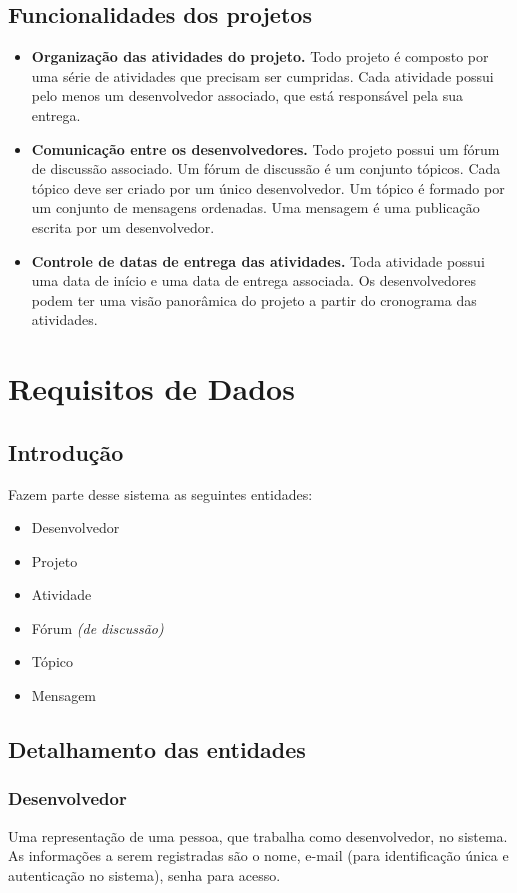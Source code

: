\documentclass{article}
\begin{document}
	\subsection{Funcionalidades dos projetos}
	\begin{itemize}
		\item \textbf{Organização das atividades do projeto.} Todo projeto é composto por uma série de atividades que precisam ser cumpridas. Cada atividade possui pelo menos um desenvolvedor associado, que está responsável pela sua entrega.

		\item \textbf{Comunicação entre os desenvolvedores.} Todo projeto possui um fórum de discussão associado. Um fórum de discussão é um conjunto tópicos. Cada tópico deve ser criado por um único desenvolvedor. Um tópico é formado por um conjunto de mensagens ordenadas. Uma mensagem é uma publicação escrita por um desenvolvedor.

		\item \textbf{Controle de datas de entrega das atividades.} Toda atividade possui uma data de início e uma data de entrega associada. Os desenvolvedores podem ter uma visão panorâmica do projeto a partir do cronograma das atividades.
	\end{itemize}


\section{Requisitos de Dados}

	\subsection{Introdução}
	Fazem parte desse sistema as seguintes entidades:
	\begin{itemize}
		\item Desenvolvedor
		\item Projeto
		\item Atividade
		\item Fórum \textit{(de discussão)}
		\item Tópico
		\item Mensagem
	\end{itemize}

	\subsection{Detalhamento das entidades}

		\subsubsection{Desenvolvedor}
		Uma representação de uma pessoa, que trabalha como desenvolvedor, no sistema. As informações a serem registradas são o nome, e-mail (para identificação única e autenticação no sistema), senha para acesso.
\end{document}
